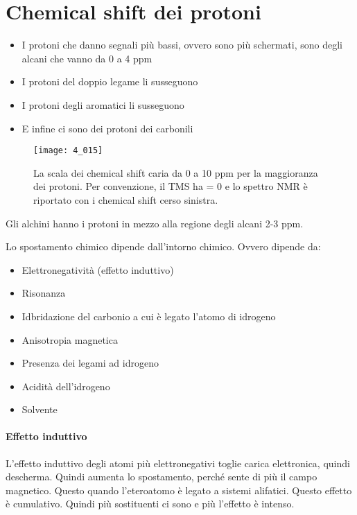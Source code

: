 \section{Chemical shift dei protoni}

\begin{itemize}
\item
  I protoni che danno segnali più bassi, ovvero sono più schermati, sono degli
  alcani che vanno da 0 a 4 ppm
\item
  I protoni del doppio legame li susseguono
\item
  I protoni degli aromatici li susseguono
\item
  E infine ci sono dei protoni dei carbonili
\end{itemize}

\begin{figure}[H]
  \texttt{[image: 4\_015]}
  \caption*{La scala dei chemical shift caria da 0 a 10 ppm per la maggioranza dei protoni. Per convenzione, il TMS ha \delta = 0 e lo spettro NMR è riportato con i chemical shift cerso sinistra.}
\end{figure}

Gli alchini hanno i protoni in mezzo alla regione degli alcani 2-3 ppm.

Lo spostamento chimico dipende dall'intorno chimico. Ovvero dipende da:
\begin{itemize}
  \item Elettronegatività (effetto induttivo)
  \item Risonanza
  \item Idbridazione del carbonio a cui è legato l'atomo di idrogeno
  \item Anisotropia magnetica
  \item Presenza dei legami ad idrogeno
  \item Acidità dell'idrogeno
  \item Solvente
\end{itemize}

\paragraph{Effetto induttivo}
L'effetto induttivo degli atomi più elettronegativi toglie carica elettronica, quindi descherma. Quindi
aumenta lo spostamento, perché sente di più il campo magnetico. Questo quando l'eteroatomo è legato a sistemi alifatici.
Questo effetto è cumulativo. Quindi più sostituenti ci sono e più l'effetto è intenso.

